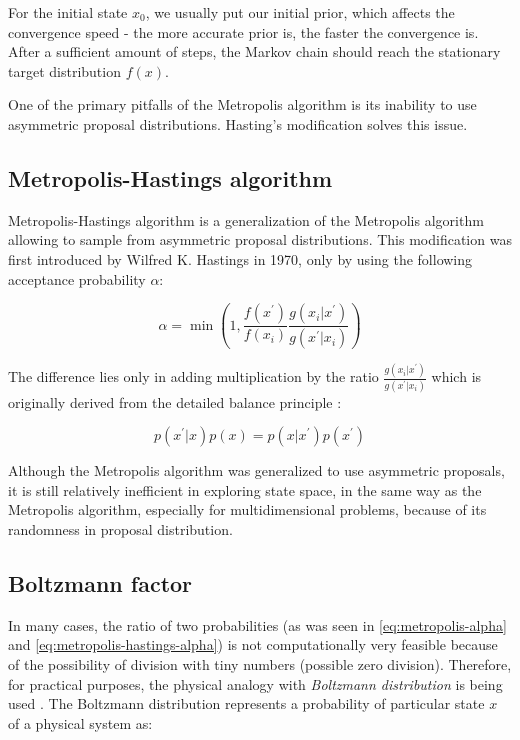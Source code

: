 \documentclass[
  digital, %
  oneside, %
  lof,     %
  lot,     %
]{fithesis4}
\begin{document}
For the initial state $x_0$, we usually put our initial prior, which affects the convergence speed - the more accurate prior is, the faster the convergence is.
After a sufficient amount of steps, the Markov chain should reach the stationary target distribution $f(x)$.

One of the primary pitfalls of the Metropolis algorithm is its inability to use asymmetric proposal distributions.
Hasting's modification solves this issue.


\subsection{Metropolis-Hastings algorithm}

Metropolis-Hastings algorithm is a generalization of the Metropolis algorithm allowing to sample from asymmetric proposal distributions.
This modification was first introduced by Wilfred K. Hastings in 1970, only by using the following acceptance probability $\alpha$:

\begin{equation}\label{eq:metropolis-hastings-alpha}
  \alpha = \min \left(1, \frac{f(x^{\prime})}{f(x_{i})} \frac{g(x_{i} | x^{\prime})}{g(x^{\prime} | x_{i})}\right)  
\end{equation}

The difference lies only in adding multiplication by the ratio $\frac{g(x_{i} | x^{\prime})}{g(x^{\prime} | x_{i})}$ which is originally derived from the detailed balance principle \cite[Chapter 11]{owen2013}:

\begin{equation}
  p(x^\prime | x) p(x) = p(x | x^\prime) p(x^\prime)
\end{equation}

Although the Metropolis algorithm was generalized to use asymmetric proposals, it is still relatively inefficient in exploring state space, in the same way as the Metropolis algorithm, especially for multidimensional problems, because of its randomness in proposal distribution.


\subsection{Boltzmann factor}
\label{sec:boltzmann-factor}

In many cases, the ratio of two probabilities (as was seen in \eqref{eq:metropolis-alpha} and \eqref{eq:metropolis-hastings-alpha}) is not computationally very feasible because of the possibility of division with tiny numbers (possible zero division).
Therefore, for practical purposes, the physical analogy with \textit{Boltzmann distribution} is being used \cite{murphy2021}.
The Boltzmann distribution represents a probability of particular state $x$ of a physical system as:
\end{document}

